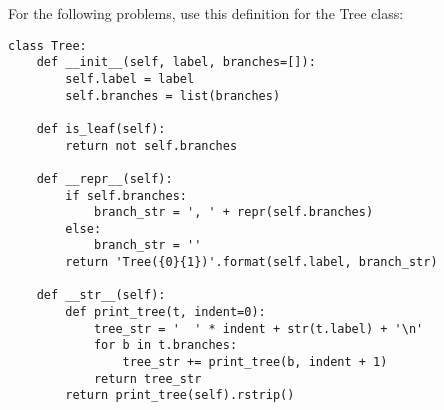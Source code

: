 For the following problems, use this definition for the Tree class:
\begin{lstlisting}
class Tree:
    def __init__(self, label, branches=[]):
        self.label = label
        self.branches = list(branches)

    def is_leaf(self):
        return not self.branches

    def __repr__(self):
        if self.branches:
            branch_str = ', ' + repr(self.branches)
        else:
            branch_str = ''
        return 'Tree({0}{1})'.format(self.label, branch_str)

    def __str__(self):
        def print_tree(t, indent=0):
            tree_str = '  ' * indent + str(t.label) + '\n'
            for b in t.branches:
                tree_str += print_tree(b, indent + 1)
            return tree_str
        return print_tree(self).rstrip()
\end{lstlisting}
